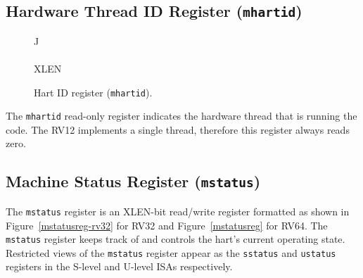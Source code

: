 \subsection{Hardware Thread ID Register
(\texttt{mhartid})}\label{hardware-thread-id-register-mhartid}

\ifdefined\MARKDOWN
\else

\begin{figure*}[htb]
	{\footnotesize
		\begin{center}
			\begin{tabular}{J}
				 \\
				\hline
				\\
				\hline
				XLEN \\
			\end{tabular}
		\end{center}
	}
	\vspace{-0.1in}
	\caption{Hart ID register (\texttt{mhartid}).}
	\label{fig:mhartidreg}
\end{figure*}

\fi

The \texttt{mhartid} read-only register indicates the hardware thread that is
running the code. The RV12 implements a single thread, therefore this
register always reads zero.

\subsection{Machine Status Register ({\tt mstatus})}

The {\tt mstatus} register is an XLEN-bit read/write register
formatted as shown in Figure~\ref{mstatusreg-rv32} for RV32 and
Figure~\ref{mstatusreg} for RV64.  The {\tt mstatus}
register keeps track of and controls the hart's current operating
state.  Restricted views of the {\tt mstatus} register appear as the
{\tt sstatus} and {\tt ustatus} registers in the S-level and U-level
ISAs respectively.

\ifdefined\MARKDOWN
\else

